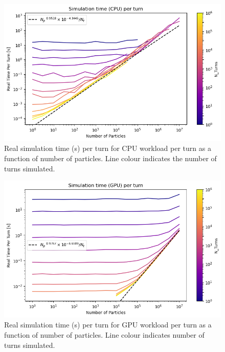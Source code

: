 \documentclass[a4paper,twoside,11pt]{report}
\begin{document}
\begin{figure}
  \centering
  \includegraphics*[width=0.77\linewidth]{CPU_graph_per_turn.png}
  \caption[CPU-bound simulation time performance]{Real simulation time (s) per turn for CPU workload per turn as a function of number of particles. Line colour indicates the number of turns simulated.}\label{fig:cpu_graph_per_turn}
\end{figure}

\begin{figure}[h]
  \centering
  \includegraphics*[width=0.77\linewidth]{GPU_graph_per_turn.png}
  \caption[GPU-accelerated simulation time performance]{Real simulation time (s) per turn for GPU workload per turn as a function of number of particles. Line colour indicates number of turns simulated.}\label{fig:gpu_graph_per_turn}
\end{figure}
\end{document}
